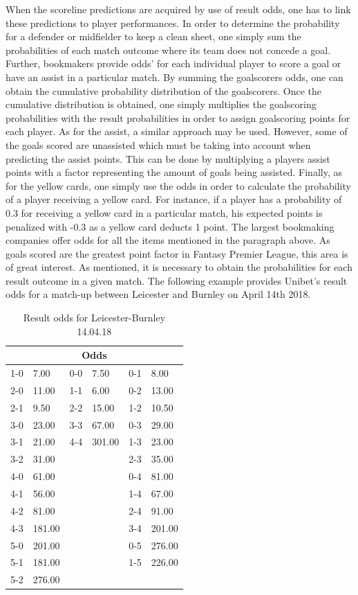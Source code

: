 When the scoreline predictions are acquired by use of result odds, one has to link these predictions to player performances. In order to determine the probability for a defender or midfielder to keep a clean sheet, one simply sum the probabilities of each match outcome where its team does not concede a goal. Further, bookmakers provide odds' for each individual player to score a goal or have an assist in a particular match. By summing the goalscorers odds, one can obtain the cumulative probability distribution of the goalscorers. Once the cumulative distribution is obtained, one simply multiplies the goalscoring probabilities with the result probabilities in order to assign goalscoring points for each player. As for the assist, a similar approach may be used. However, some of the goals scored are unassisted which must be taking into account when predicting the assist points. This can be done by multiplying a players assist points with a factor representing the amount of goals being assisted. Finally, as for the yellow cards, one simply use the odds in order to calculate the probability of a player receiving a yellow card. For instance, if a player has a probability of 0.3 for receiving a yellow card in a particular match, his expected points is penalized with -0.3 as a yellow card deducts 1 point. 
\newpar
The largest bookmaking companies offer odds for all the items mentioned in the paragraph above. As goals scored are the greatest point factor in Fantasy Premier League, this area is of great interest. As mentioned, it is necessary to obtain the probabilities for each result outcome in a given match. The following example provides Unibet's result odds for a match-up between Leicester and Burnley on April 14th 2018. 

\begin{table}[H]
\centering
\caption{Result odds for Leicester-Burnley 14.04.18}
\label{Leicester-Burnley}
\begin{tabular}{|ll|ll|ll|}
\multicolumn{6}{c}{Odds}                   \\
\hline
1-0 & 7.00   & 0-0 & 7.50   & 0-1 & 8.00   \\
2-0 & 11.00  & 1-1 & 6.00   & 0-2 & 13.00  \\
2-1 & 9.50   & 2-2 & 15.00  & 1-2 & 10.50  \\
3-0 & 23.00  & 3-3 & 67.00  & 0-3 & 29.00  \\
3-1 & 21.00  & 4-4 & 301.00 & 1-3 & 23.00  \\
3-2 & 31.00  &     &        & 2-3 & 35.00  \\
4-0 & 61.00  &     &        & 0-4 & 81.00  \\
4-1 & 56.00  &     &        & 1-4 & 67.00  \\
4-2 & 81.00  &     &        & 2-4 & 91.00  \\
4-3 & 181.00 &     &        & 3-4 & 201.00 \\
5-0 & 201.00 &     &        & 0-5 & 276.00 \\
5-1 & 181.00 &     &        & 1-5 & 226.00 \\
5-2 & 276.00 &     &        &     &        \\
\hline
\end{tabular}
\end{table}

